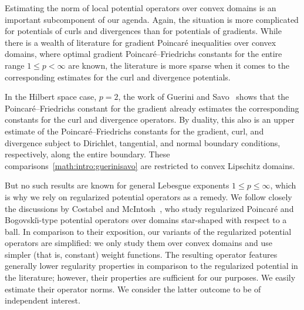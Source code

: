 \documentclass[12pt,a4paper]{article}
\begin{document}


Estimating the norm of local potential operators over convex domains is an important subcomponent of our agenda. 
Again, the situation is more complicated for potentials of curls and divergences than for potentials of gradients.
While there is a wealth of literature for gradient Poincar\'e inequalities over convex domains, where optimal gradient Poincar\'e--Friedrichs constants for the entire range $1 \leq p < \infty$ are known,
the literature is more sparse when it comes to the corresponding estimates for the curl and divergence potentials.

In the Hilbert space case, $p=2$, the work of Guerini and Savo~\cite{guerini2004eigenvalue} shows that the Poincar\'e--Friedrichs constant for the gradient already estimates the corresponding constants for the curl and divergence operators. By duality, this also is an upper estimate of the Poincar\'e--Friedrichs constants for the gradient, curl, and divergence subject to Dirichlet, tangential, and normal boundary conditions, respectively, along the entire boundary. These comparisons~\eqref{math:intro:guerinisavo} are restricted to convex Lipschitz domains. 

But no such results are known for general Lebesgue exponents $1 \leq p \leq \infty$, which is why we rely on regularized potential operators as a remedy. 
We follow closely the discussions by Costabel and McIntosh~\cite{costabel2010bogovskiui},
who study regularized Poincar\'e and Bogovski\u{\i}-type potential operators over domains star-shaped with respect to a ball. 
In comparison to their exposition, our variants of the regularized potential operators are simplified:
we only study them over convex domains and use simpler (that is, constant) weight functions. 
The resulting operator features generally lower regularity properties in comparison to the regularized potential in the literature;
however, their properties are sufficient for our purposes. We easily estimate their operator norms. 
We consider the latter outcome to be of independent interest. 
\end{document}
